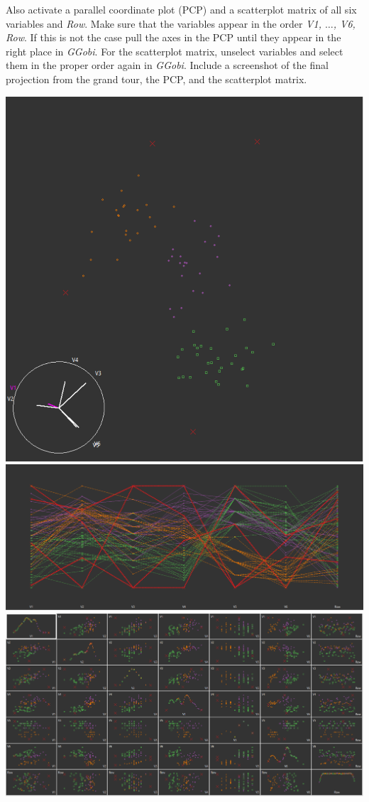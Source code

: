 \documentclass[12pt,letterpaper,final]{article}
\begin{document}
\begin{enumerate}
\begin{enumerate}
Also activate a parallel coordinate plot (PCP) and a scatterplot matrix of all
six variables and {\it Row}. Make sure that the variables
appear in the order {\it V1, $\ldots$, V6, Row}. If this is not the case
pull the axes in the PCP until they appear in the right place in {\it GGobi}.
For the scatterplot matrix, unselect variables and select them in the
proper order again in {\it GGobi}. Include a screenshot of the final projection
from the grand tour, the PCP, and the scatterplot matrix.
  \begin{center}
    \includegraphics[width=11 cm]{p4c_Tour.png}\\
    \includegraphics[width=11 cm]{p4c_PCP.png}\\
    \includegraphics[width=11 cm]{p4c_scatter.png}\\
  \end{center}




\end{enumerate}
\end{enumerate}
\end{document}
